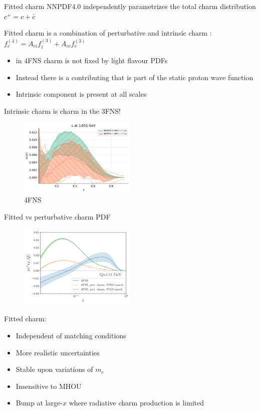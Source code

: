 \documentclass[aspectratio=43, 8pt,t]{beamer}
\begin{document}
\begin{frame}{Fitted charm}
  NNPDF4.0 independently parametrizes the total charm distribution $c^+=c+\bar{c}$

  \vspace*{1em}
  Fitted charm is a combination of perturbative and intrinsic charm : \\
  $f_c^{(4)} = A_{ci}f_i^{(3)}+A_{cc}f_c^{(3)}$
  \begin{itemize}
    \item in 4FNS charm is not fixed by light flavour PDFs
    \item Instead there is a contributing that is part of the static proton wave function
    \item Intrinsic component is present at all scales
  \end{itemize}

  \vspace*{1em}
  Intrinsic charm is charm in the 3FNS!

  \begin{figure}
    \includegraphics[width=0.5\textwidth]{nnpdf40_vs_nnpdf31.pdf}
    \caption*{4FNS}
  \end{figure}
\end{frame}

\begin{frame}{Fitted vs perturbative charm PDF}
  \begin{figure}
    \includegraphics[width=0.5\textwidth]{pch_vs_fitted_forward.pdf}
  \end{figure}

  Fitted charm:
  \begin{itemize}
    \item Independent of matching conditions
    \item More realistic uncertainties
    \item Stable upon variations of $m_c$
    \item Insensitive to MHOU
    \item Bump at large-$x$ where radiative charm production is limited
  \end{itemize}
\end{frame}
\end{document}
